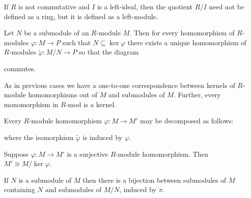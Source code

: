 \documentclass[12pt, a4paper, oneside, openright, titlepage]{book}
\begin{document}
\begin{rmk}
    If $R$ is not commutative and $I$ is a left-ideal, then the quotient $R/I$ need not be defined as a ring, but it is defined as a left-module.
\end{rmk}


\begin{thm}
    Let $N$ be a submodule of an $R$-module $M$. Then for every homomorphism of $R$-modules $\varphi:M\rightarrow P$ such that $N \subseteq \ker \varphi$ there exists a unique homomorphism of $R$-modules $\widetilde{\varphi}:M/N\rightarrow P$ so that the diagram 
    \begin{center}
\end{center}
commutes.
\end{thm}

As in previous cases we have a one-to-one correspondence between kernels of $R$-module homomorphisms out of $M$ and submodules of $M$. Further, every monomorphism in $R$-mod is a kernel.


\begin{thm}
    Every $R$-module homomorphism $\varphi:M\rightarrow M'$ may be decomposed as follows: 
    \begin{center}
\end{center}
    where the isomorphism $\widetilde{\varphi}$ is induced by $\varphi$.
\end{thm}

\begin{cor}
    Suppose $\varphi:M\rightarrow M'$ is a surjective $R$-module homomorphism. Then $M'\cong M/\ker \varphi$.
\end{cor}
If $N$ is a submodule of $M$ then there is a bijection between submodules of $M$ containing $N$ and submodules of $M/N$, induced by $\pi$.
\end{document}
